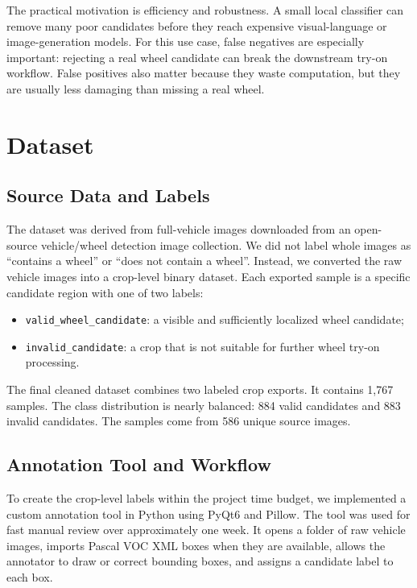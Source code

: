 \documentclass[letterpaper, 10 pt]{IEEEconf}
\begin{document}
The practical motivation is efficiency and robustness. A small local classifier
can remove many poor candidates before they reach expensive visual-language or
image-generation models. For this use case, false negatives are especially
important: rejecting a real wheel candidate can break the downstream try-on
workflow. False positives also matter because they waste computation, but they
are usually less damaging than missing a real wheel.

\section{Dataset}

\subsection{Source Data and Labels}

The dataset was derived from full-vehicle images downloaded from an open-source
vehicle/wheel detection image collection. We did not label whole images as
``contains a wheel'' or ``does not contain a wheel''. Instead, we converted the
raw vehicle images into a crop-level binary dataset. Each exported sample is a
specific candidate region with one of two labels:
\begin{itemize}
    \item \texttt{valid\_wheel\_candidate}: a visible and sufficiently localized
    wheel candidate;
    \item \texttt{invalid\_candidate}: a crop that is not suitable for further
    wheel try-on processing.
\end{itemize}

The final cleaned dataset combines two labeled crop exports. It contains 1,767
samples. The class distribution is nearly balanced: 884 valid candidates and
883 invalid candidates. The samples come from 586 unique source images.

\subsection{Annotation Tool and Workflow}

To create the crop-level labels within the project time budget, we implemented
a custom annotation tool in Python using PyQt6 and Pillow. The tool was used
for fast manual review over approximately one week. It opens a folder of raw
vehicle images, imports Pascal VOC XML boxes when they are available, allows the
annotator to draw or correct bounding boxes, and assigns a candidate label to
each box.
\end{document}
